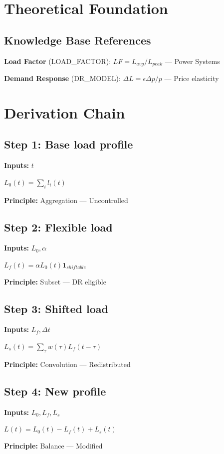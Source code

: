 \documentclass[11pt,twocolumn]{article}
\begin{document}
\section{Theoretical Foundation}

\subsection{Knowledge Base References}
\textbf{Load Factor} (LOAD_FACTOR): $LF = L_{avg}/L_{peak}$ --- Power Systems

\textbf{Demand Response} (DR_MODEL): $\Delta L = \epsilon \Delta p / p$ --- Price elasticity


\section{Derivation Chain}

\subsection*{Step 1: Base load profile}
\textbf{Inputs:} $t$

$L_0(t) = \sum_i l_i(t)$

\textbf{Principle:} Aggregation --- Uncontrolled

\subsection*{Step 2: Flexible load}
\textbf{Inputs:} $L_0, \alpha$

$L_f(t) = \alpha L_0(t) \mathbf{1}_{shiftable}$

\textbf{Principle:} Subset --- DR eligible

\subsection*{Step 3: Shifted load}
\textbf{Inputs:} $L_f, \Delta t$

$L_s(t) = \sum_{\tau} w(\tau) L_f(t-\tau)$

\textbf{Principle:} Convolution --- Redistributed

\subsection*{Step 4: New profile}
\textbf{Inputs:} $L_0, L_f, L_s$

$L(t) = L_0(t) - L_f(t) + L_s(t)$

\textbf{Principle:} Balance --- Modified
\end{document}
